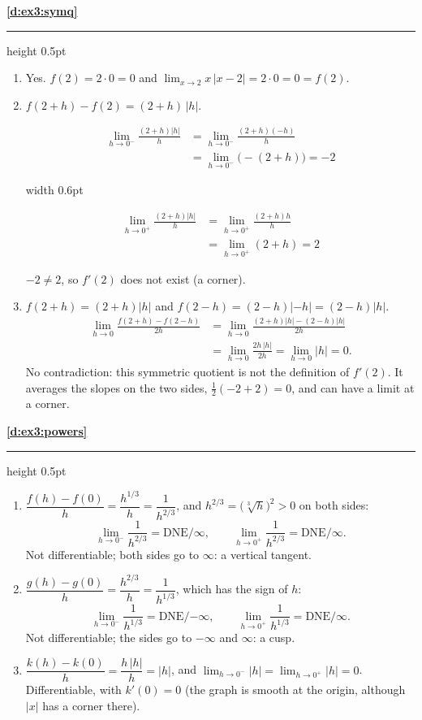 \documentclass[11pt,a4paper]{article}
\newcommand{\solitem}[2]{%
 \par\addvspace{16pt}\Needspace{10\baselineskip}%
 {\large\bfseries \ref{#1}}\par\nobreak\vspace{2pt}%
 {\color{rulegray}\hrule height 0.5pt}\nobreak\vspace{7pt}%
 #2\par}
\newcommand{\DNEinf}{\ensuremath{\text{DNE}/\infty}}
\newcommand{\DNEninf}{\ensuremath{\text{DNE}/{-\infty}}}
\newcommand{\twosides}[2]{\par\smallskip\noindent\begin{minipage}[t]{0.47\linewidth}#1\end{minipage}\hfill{\color{rulegray}\vrule width 0.6pt}\hfill\begin{minipage}[t]{0.47\linewidth}#2\end{minipage}\par\smallskip}
\begin{document}
\solitem{d:ex3:symq}{%
\begin{enumerate}[label=(\alph*)]
 \item Yes. $f(2)=2\cdot0=0$ and $\displaystyle\lim_{x\to2}x\,|x-2|=2\cdot0=0=f(2)$.
 \item $f(2+h)-f(2)=(2+h)\,|h|$.
 \twosides{%
 \begin{align*}
 \lim_{h\to0^-}\frac{(2+h)|h|}{h}&=\lim_{h\to0^-}\frac{(2+h)(-h)}{h}\\
 &=\lim_{h\to0^-}\bigl(-(2+h)\bigr)=-2
 \end{align*}}{%
 \begin{align*}
 \lim_{h\to0^+}\frac{(2+h)|h|}{h}&=\lim_{h\to0^+}\frac{(2+h)h}{h}\\
 &=\lim_{h\to0^+}(2+h)=2
 \end{align*}}
 $-2\ne2$, so $f'(2)$ does not exist (a corner).
 \item $f(2+h)=(2+h)|h|$ and $f(2-h)=(2-h)|-h|=(2-h)|h|$.
 \begin{align*}
 \lim_{h\to0}\frac{f(2+h)-f(2-h)}{2h}&=\lim_{h\to0}\frac{(2+h)|h|-(2-h)|h|}{2h}\\
 &=\lim_{h\to0}\frac{2h\,|h|}{2h}=\lim_{h\to0}|h|=0.
 \end{align*}
 No contradiction: this symmetric quotient is not the definition of $f'(2)$. It averages the slopes on the two sides, $\frac12(-2+2)=0$, and can have a limit at a corner.
\end{enumerate}
}

\solitem{d:ex3:powers}{%
\begin{enumerate}[label=(\alph*)]
 \item $\dfrac{f(h)-f(0)}{h}=\dfrac{h^{1/3}}{h}=\dfrac{1}{h^{2/3}}$, and $h^{2/3}=\bigl(\sqrt[3]{h}\bigr)^2>0$ on both sides:
 \[
 \lim_{h\to0^-}\frac{1}{h^{2/3}}=\DNEinf,\qquad \lim_{h\to0^+}\frac{1}{h^{2/3}}=\DNEinf.
 \]
 Not differentiable; both sides go to $\infty$: a vertical tangent.
 \item $\dfrac{g(h)-g(0)}{h}=\dfrac{h^{2/3}}{h}=\dfrac{1}{h^{1/3}}$, which has the sign of $h$:
 \[
 \lim_{h\to0^-}\frac{1}{h^{1/3}}=\DNEninf,\qquad \lim_{h\to0^+}\frac{1}{h^{1/3}}=\DNEinf.
 \]
 Not differentiable; the sides go to $-\infty$ and $\infty$: a cusp.
 \item $\dfrac{k(h)-k(0)}{h}=\dfrac{h\,|h|}{h}=|h|$, and $\displaystyle\lim_{h\to0^-}|h|=\lim_{h\to0^+}|h|=0$.
 Differentiable, with $k'(0)=0$ (the graph is smooth at the origin, although $|x|$ has a corner there).
\end{enumerate}
}
\end{document}
